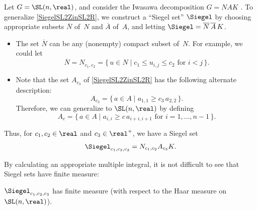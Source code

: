 \begin{defn} \label{SiegelSLnZDefn}
Let $G = \SL(n,\real)$, and consider the Iwasawa decomposition $G = NAK$ .
To generalize \cref{SiegelSL2ZinSL2R}, we construct a ``Siegel set'' $\Siegel$ by choosing appropriate subsets $\overline{N}$ of~$N$ and $\overline{A}$ of~$A$, and letting $\Siegel = \overline{N} \, \overline{A} \, K$. 

\begin{itemize}
\item The set $\overline{N}$ can be any (nonempty) compact subset of~$N$. For example, we could let 
	$$\overline{N} = N_{c_1,c_2} = \{\, u \in N \mid \text{$c_1 \le u_{i,j} \le c_2$ for $i < j$} \,\} .$$
\item Note that the set $A_{c_3}$ of \cref{SiegelSL2ZinSL2R} has the following alternate description:
	$$ A_{c_3} = \{\, a \in A \mid a_{1,1} \ge c_3 \, a_{2,2} \,\}. $$
Therefore, we can generalize to $\SL(n,\real)$ by defining
	$$ A_c = \{\, a \in A \mid \text{$a_{i,i}   \ge c \, a_{i+i,i+1}$ for $i = 1,\ldots,n-1$} \,\} .$$
\end{itemize}
Thus, for $c_1,c_2 \in \real$ and $c_3 \in \real^+$, we have a Siegel set%
	$$\Siegel_{c_1,c_2,c_3} = N_{c_1,c_2} A_{c_3} K .$$
\end{defn}

By calculating an appropriate multiple integral, it is not difficult to see that Siegel sets have finite measure:

\begin{prop} \label{SiegelSLnRFinMeas}
$\Siegel_{c_1,c_2,c_3}$ has finite measure\/ \textup(with respect to the Haar measure on\/ $\SL(n,\real)$\textup).
\end{prop}


